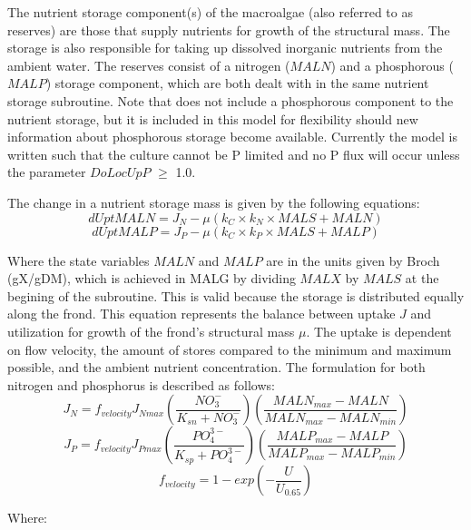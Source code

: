 \documentclass{deltares_manual}
\begin{document}
The nutrient storage component(s) of the macroalgae (also referred to as reserves) are those that supply nutrients for growth of the structural mass. The storage is also responsible for taking up dissolved inorganic nutrients from the ambient water. The reserves consist of a nitrogen ($MALN$) and a phosphorous ($MALP$) storage component, which are both dealt with in the same nutrient storage subroutine. Note that \cite{broch2012} does not include a phosphorous component to the nutrient storage, but it is included in this model for flexibility should new information about phosphorous storage become available. Currently the model is written such that the culture cannot be P limited and no P flux will occur unless the parameter $DoLocUpP$ $\ge$ 1.0.
 
The change in a nutrient storage mass is given by the following equations:
\begin{equation}
dUptMALN = J_N - \mu(k_C \times k_N \times MALS + MALN)
\end{equation}
\begin{equation}
dUptMALP = J_P - \mu(k_C \times k_P \times MALS + MALP)
\end{equation}

Where the state variables $MALN$ and $MALP$ are in the units given by Broch (gX/gDM), which is achieved in MALG by dividing $MALX$ by $MALS$ at the begining of the subroutine. This is valid because the storage is distributed equally along the frond. This equation represents the balance between uptake $J$ and utilization for growth of the frond's structural mass $\mu$. The uptake is dependent on flow velocity, the amount of stores compared to the minimum and maximum possible, and the ambient nutrient concentration. The formulation for both nitrogen and phosphorus is described as follows:
\begin{equation}
J_N = f_{velocity}J_{Nmax}(\frac{NO_3^-}{K_{sn}+NO_3^-})(\frac{MALN_{max}-MALN}{MALN_{max}-MALN_{min}})
\end{equation}
\begin{equation}
J_P = f_{velocity}J_{Pmax}(\frac{PO_4^{3-}}{K_{sp}+PO_4^{3-}})(\frac{MALP_{max}-MALP}{MALP_{max}-MALP_{min}})
\end{equation}
\begin{equation}
f_{velocity} = 1-exp(-\frac{U}{U_{0.65}})
\end{equation}

Where:\\
\end{document}

